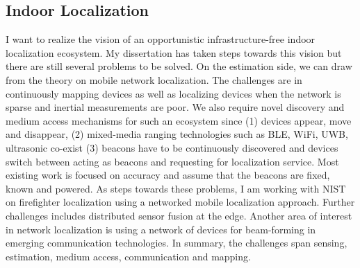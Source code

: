 \documentclass[10pt]{article}
\begin{document}
\subsection{Indoor Localization}
I want to realize the vision of an opportunistic infrastructure-free indoor localization ecosystem. My dissertation has taken steps towards this vision but there are still several problems to be solved. 
On the estimation side, we can draw from the theory on mobile network localization. The challenges are in continuously mapping devices as well as localizing devices when the network is sparse and inertial measurements are poor. %
We also require novel discovery and medium access mechanisms for such an ecosystem since (1) devices appear, move and disappear, (2)  mixed-media ranging technologies such as BLE, WiFi, UWB, ultrasonic co-exist (3) beacons have to be continuously discovered and devices switch between acting as beacons and requesting for localization service. Most existing work is focused on accuracy and assume that the beacons are fixed, known and powered. %
As steps towards these problems, I am working with NIST on firefighter localization using a networked mobile localization approach. Further challenges includes distributed sensor fusion at the edge. Another area of interest in network localization is using a network of devices for beam-forming in emerging communication technologies. %
In summary, the challenges span sensing, estimation, medium access, communication and mapping. %
\end{document}
